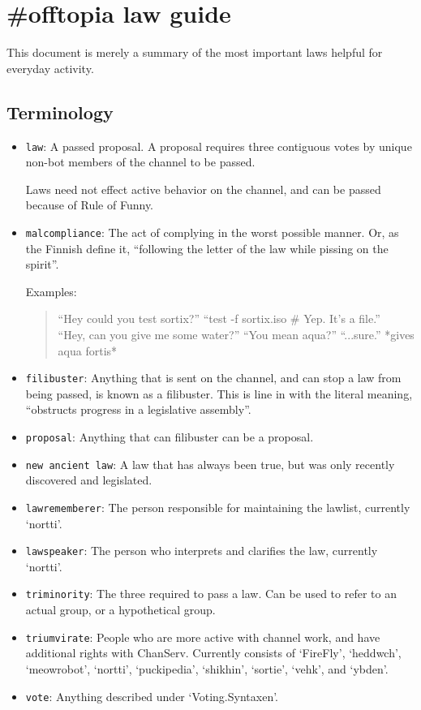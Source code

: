 \documentclass[11pt]{article}
\begin{document}
\section{\#offtopia law guide}

This document is merely a summary of the most important laws helpful for everyday
activity.


\subsection{Terminology}

\begin{itemize}
\item \texttt{law}: A passed proposal. A proposal requires three contiguous votes
by unique non-bot members of the channel to be passed.

Laws need not effect active behavior on the channel, and can be passed because of
Rule of Funny.

\item \texttt{malcompliance}: The act of complying in the worst possible manner. Or,
as the Finnish define it, ``following the letter of the law while pissing on the spirit''.

Examples:
\begin{quote}
``Hey could you test sortix?'' ``test -f sortix.iso \# Yep. It's a file.'' \\
``Hey, can you give me some water?'' ``You mean aqua?'' ``...sure.'' *gives aqua fortis*
\end{quote}

\item \texttt{filibuster}: Anything that is sent on the channel, and can stop a
law from being passed, is known as a filibuster. This is line in with the literal meaning,
``obstructs progress in a legislative assembly''.

\item \texttt{proposal}: Anything that can filibuster can be a proposal.

\item \texttt{new ancient law}: A law that has always been true, 
but was only recently discovered and legislated.

\item \texttt{lawrememberer}: The person responsible for maintaining the lawlist,
currently `nortti'.

\item \texttt{lawspeaker}: The person who interprets and clarifies the law,
currently `nortti'.

\item \texttt{triminority}: The three required to pass a law. Can be used to refer to
an actual group, or a hypothetical group.

\item \texttt{triumvirate}: People who are more active with channel work, and have
additional rights with ChanServ. Currently consists of `FireFly', `heddwch', `meowrobot',
`nortti', `puckipedia', `shikhin', `sortie', `vehk', and `ybden'.

\item \texttt{vote}: Anything described under `Voting.Syntaxen'.
\end{itemize}
\end{document}
